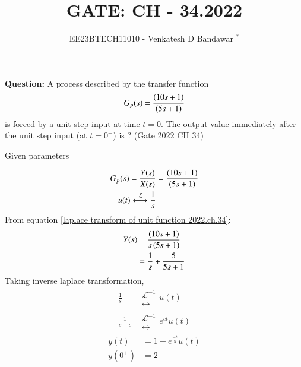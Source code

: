 \documentclass[journal,12pt,twocolumn]{IEEEtran}
\theoremstyle{remark}
\begin{document}

\vspace{3cm}

\title{GATE: CH - 34.2022}
\author{EE23BTECH11010 - Venkatesh D Bandawar $^{*}$%
}
\maketitle
\bigskip


\textbf{Question:} A process described by the transfer function
\begin{align}
    G_p(s) = \frac{\left(10s+1\right)}{\left(5s+1\right)} \nonumber
\end{align}
is forced by a unit step input at time $t = 0$. The output value immediately after the unit step input (at $t = 0^+$) is ? \hfill(Gate 2022 CH 34)\\
\solution
\begin{table}[!h] 
\centering

\caption{Given parameters}
\label{given parameters list.gate.2022.ch.34}
\end{table}
\begin{align}
    G_p(s) = \frac{Y(s)}{X(s)} &= \frac{\brak{10s+1}}{\brak{5s+1}}\\
    u(t) \system{\mathcal{L}} \frac{1}{s} \label{laplace transform of unit function 2022.ch.34}
\end{align}
From equation \eqref{laplace transform of unit function 2022.ch.34}:
\begin{align}
    Y(s) &= \frac{\left(10s+1\right)}{s\left(5s+1\right)}\\
    &= \frac{1}{s} + \frac{5}{5s+1}
\end{align}
Taking inverse laplace transformation, 
\begin{align}
    \frac{1}{s} &\mathrel{\substack{\mathcal{L}^{-1}\\\longleftrightarrow}} u(t)\\
    \frac{1}{s-c} &\mathrel{\substack{\mathcal{L}^{-1}\\\longleftrightarrow}} e^{ct} u(t)
\end{align}
\begin{align}
    y(t) &= {1 + e^{\frac{-t}{5}}}u(t)\\
    y(0^+) &= 2
\end{align}
\end{document}
